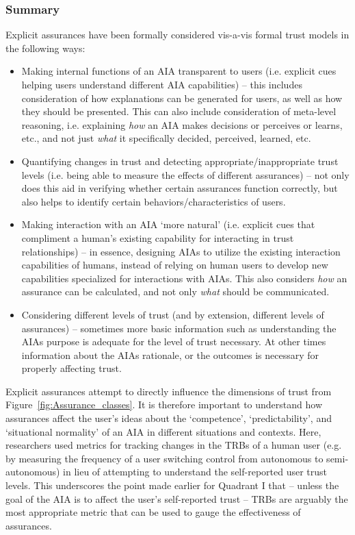\subsubsection{Summary}
Explicit assurances have been formally considered vis-a-vis formal trust models in the following ways:
\begin{itemize}
    \item Making internal functions of an AIA transparent to users (i.e. explicit cues helping users understand different AIA capabilities) -- this includes consideration of how explanations can be generated for users, as well as how they should be presented. This can also include consideration of meta-level reasoning, i.e. explaining \textit{how} an AIA makes decisions or perceives or learns, etc., and not just \textit{what} it specifically decided, perceived, learned, etc. 
    \item Quantifying changes in trust and detecting appropriate/inappropriate trust levels (i.e. being able to measure the effects of different assurances) -- not only does this aid in verifying whether certain assurances function correctly, but also helps to identify certain behaviors/characteristics of users.
    \item Making interaction with an AIA `more natural' (i.e. explicit cues that compliment a human's existing capability for interacting in trust relationships) -- in essence, designing AIAs to utilize the existing interaction capabilities of humans, instead of relying on human users to develop new capabilities specialized for interactions with AIAs. This also considers \emph{how} an assurance can be calculated, and not only \emph{what} should be communicated. 
    \item Considering different levels of trust (and by extension, different levels of assurances) -- sometimes more basic information such as understanding the AIAs purpose is adequate for the level of trust necessary. At other times information about the AIAs rationale, or the outcomes is necessary for properly affecting trust.
\end{itemize}

Explicit assurances attempt to directly influence the dimensions of trust from Figure~\ref{fig:Assurance_classes}. 
It is therefore important to understand how assurances affect the user's ideas about the `competence', `predictability', and `situational normality' of an AIA in different situations and contexts. 
Here, researchers used metrics for tracking changes in the TRBs of a human user (e.g. by measuring the frequency of a user switching control from autonomous to semi-autonomous) in lieu of attempting to understand the self-reported user trust levels. 
This underscores the point made earlier for Quadrant I that -- unless the goal of the AIA is to affect the user's self-reported trust -- TRBs are arguably the most appropriate metric that can be used to gauge the effectiveness of assurances. %
